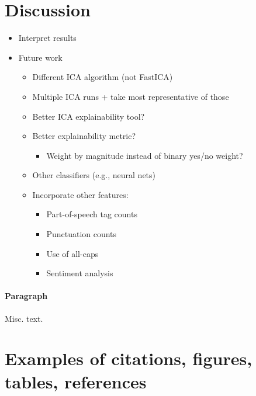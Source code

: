 \documentclass{article}
\begin{document}
\hypertarget{discussion}{%
\section{Discussion}\label{discussion}}

\label{sec:discuss}

\begin{itemize}
\tightlist
\item
  Interpret results
\item
  Future work

  \begin{itemize}
  \tightlist
  \item
    Different ICA algorithm (not FastICA)
  \item
    Multiple ICA runs + take most representative of those
  \item
    Better ICA explainability tool?
  \item
    Better explainability metric?

    \begin{itemize}
    \tightlist
    \item
      Weight by magnitude instead of binary yes/no weight?
    \end{itemize}
  \item
    Other classifiers (e.g., neural nets)
  \item
    Incorporate other features:

    \begin{itemize}
    \tightlist
    \item
      Part-of-speech tag counts
    \item
      Punctuation counts
    \item
      Use of all-caps
    \item
      Sentiment analysis
    \end{itemize}
  \end{itemize}
\end{itemize}

\paragraph{Paragraph}

Misc. text.

\hypertarget{examples-of-citations-figures-tables-references}{%
\section{Examples of citations, figures, tables,
references}\label{examples-of-citations-figures-tables-references}}
\end{document}
